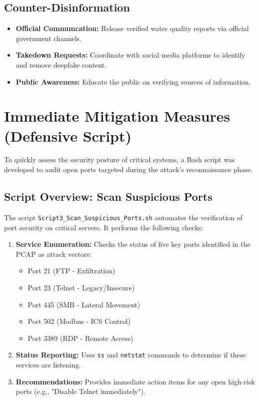 \documentclass[12pt,a4paper]{article}
\begin{document}
\subsection{Counter-Disinformation}
\begin{itemize}
    \item \textbf{Official Communcation:} Release verified water quality reports via official government channels.
    \item \textbf{Takedown Requests:} Coordinate with social media platforms to identify and remove deepfake content.
    \item \textbf{Public Awareness:} Educate the public on verifying sources of information.
\end{itemize}

\section{Immediate Mitigation Measures (Defensive Script)}
To quickly assess the security posture of critical systems, a Bash script was developed to audit open ports targeted during the attack's reconnaissance phase.

\subsection{Script Overview: Scan Suspicious Ports}
The script \texttt{Script3\_Scan\_Suspicious\_Ports.sh} automates the verification of port security on critical servers. It performs the following checks:
\begin{enumerate}
    \item \textbf{Service Enumeration:} Checks the status of five key ports identified in the PCAP as attack vectors:
    \begin{itemize}
        \item Port 21 (FTP - Exfiltration)
        \item Port 23 (Telnet - Legacy/Insecure)
        \item Port 445 (SMB - Lateral Movement)
        \item Port 502 (Modbus - ICS Control)
        \item Port 3389 (RDP - Remote Access)
    \end{itemize}
    \item \textbf{Status Reporting:} Uses \texttt{ss} and \texttt{netstat} commands to determine if these services are listening.
    \item \textbf{Recommendations:} Provides immediate action items for any open high-risk ports (e.g., "Disable Telnet immediately").
\end{enumerate}
\end{document}
